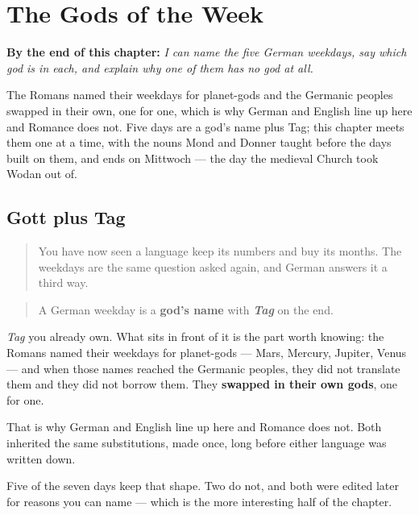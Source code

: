 
\chapter{The Gods of the Week}
\label{ch:ge-wochentage}

\begin{chapteropening}
\textbf{By the end of this chapter:} \emph{I can name the five German weekdays, say which god is in each, and explain why one of them has no god at all.}

The Romans named their weekdays for planet-gods and the Germanic peoples swapped in their own, one for one, which is why German and English line up here and Romance does not. Five days are a god's name plus Tag; this chapter meets them one at a time, with the nouns Mond and Donner taught before the days built on them, and ends on Mittwoch — the day the medieval Church took Wodan out of.
\end{chapteropening}

\section[Gott plus Tag]{Gott plus Tag}

\label{lesson:GE-C07-tag-muster}



\begin{quote}
You have now seen a language keep its numbers and buy its months. The weekdays are the same question asked again, and German answers it a third way.
\end{quote}

\begin{grammarlens}[title={Grammar Lens: a god, then Tag}]
\begin{quote}
A German weekday is a \textbf{god's name} with \emph{\textbf{Tag}} on the end.
\end{quote}

\emph{Tag} you already own. What sits in front of it is the part worth knowing: the Romans named their weekdays for planet-gods — Mars, Mercury, Jupiter, Venus — and when those names reached the Germanic peoples, they did not translate them and they did not borrow them. They \textbf{swapped in their own gods}, one for one.

That is why German and English line up here and Romance does not. Both inherited the same substitutions, made once, long before either language was written down.

Five of the seven days keep that shape. Two do not, and both were edited later for reasons you can name — which is the more interesting half of the chapter.
\end{grammarlens}

